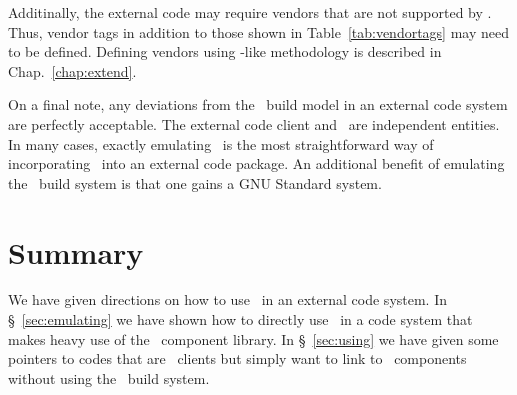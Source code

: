 Additinally, the external code may require vendors that are not
supported by \draco.  Thus, vendor tags in addition to those shown in
Table~\ref{tab:vendortags} may need to be defined.  Defining vendors
using \draco-like methodology is described in
Chap.~\ref{chap:extend}.  

On a final note, any deviations from the \draco\ build model in an
external code system are perfectly acceptable.  The external code
client and \draco\ are independent entities.  In many cases, exactly
emulating \draco\ is the most straightforward way of incorporating
\draco\ into an external code package.  An additional benefit of
emulating the \draco\ build system is that one gains a GNU Standard
system.


\section{Summary}

We have given directions on how to use \draco\ in an external code
system.  In \S~\ref{sec:emulating} we have shown how to directly use
\draco\ in a code system that makes heavy use of the \draco\ component 
library.  In \S~\ref{sec:using} we have given some pointers to codes
that are \draco\ clients but simply want to link to \draco\
components without using the \draco\ build system.